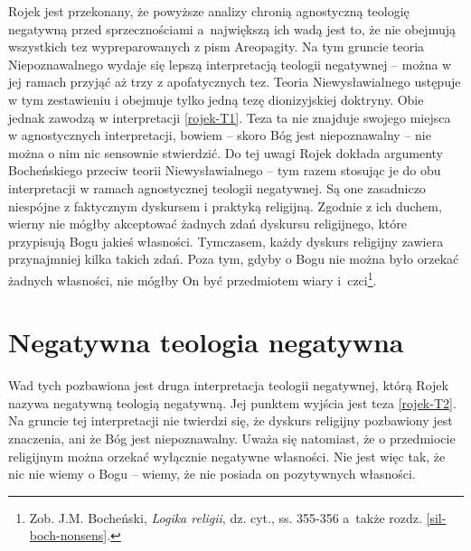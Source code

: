 




Rojek jest przekonany, że powyższe analizy chronią agnostyczną teologię negatywną przed
sprzecznościami a~największą ich wadą jest to, że nie obejmują wszystkich tez wypreparowanych z pism Areopagity.
Na tym gruncie teoria Niepoznawalnego wydaje się lepszą
interpretacją teologii negatywnej -- można w jej ramach
przyjąć aż trzy z apofatycznych tez. Teoria
Niewysławialnego ustępuje w tym zestawieniu  i obejmuje tylko jedną
tezę dionizyjskiej doktryny. Obie jednak zawodzą w interpretacji \eqref{rojek-T1}.
Teza ta nie znajduje swojego miejsca w agnostycznych 
interpretacji, bowiem -- skoro Bóg jest niepoznawalny -- nie można o nim
nic sensownie stwierdzić.
Do tej uwagi Rojek dokłada argumenty Bocheńskiego przeciw teorii Niewysławialnego -- tym razem stosując je do obu interpretacji w ramach agnostycznej teologii negatywnej.
Są one zasadniczo niespójne z faktycznym dyskursem
i praktyką religijną. Zgodnie z ich duchem, wierny nie mógłby
akceptować żadnych zdań dyskursu religijnego, które przypisują Bogu
jakieś własności. Tymczasem, każdy dyskurs religijny zawiera
przynajmniej kilka takich zdań. Poza tym, gdyby o Bogu nie można było
orzekać żadnych własności, nie mógłby On być przedmiotem wiary i~czci\footnote{
Zob. J.M. Bocheński, \textit{Logika religii}, dz. cyt., ss. 355-356 a~także rozdz. \ref{sil-boch-nonsens}.}.




\section{Negatywna teologia negatywna}

Wad tych pozbawiona jest druga interpretacja teologii negatywnej, którą
Rojek nazywa negatywną teologią negatywną. Jej punktem wyjścia jest
teza \eqref{rojek-T2}. Na gruncie tej interpretacji nie twierdzi się, że
dyskurs religijny pozbawiony jest znaczenia, ani że Bóg jest
niepoznawalny. Uważa się natomiast, że o przedmiocie religijnym można
orzekać wyłącznie negatywne własności. Nie jest więc tak, że nic nie
wiemy o Bogu -- wiemy, że nie posiada on pozytywnych własności.

